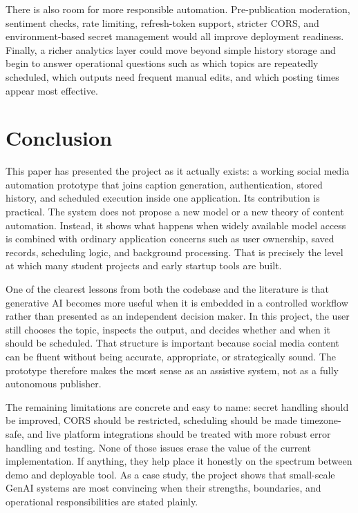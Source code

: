 \documentclass[conference]{IEEEtran}
\begin{document}
There is also room for more responsible automation. Pre-publication moderation, sentiment checks, rate limiting, refresh-token support, stricter CORS, and environment-based secret management would all improve deployment readiness. Finally, a richer analytics layer could move beyond simple history storage and begin to answer operational questions such as which topics are repeatedly scheduled, which outputs need frequent manual edits, and which posting times appear most effective.

\section{Conclusion}

This paper has presented the project as it actually exists: a working social media automation prototype that joins caption generation, authentication, stored history, and scheduled execution inside one application. Its contribution is practical. The system does not propose a new model or a new theory of content automation. Instead, it shows what happens when widely available model access is combined with ordinary application concerns such as user ownership, saved records, scheduling logic, and background processing. That is precisely the level at which many student projects and early startup tools are built.

One of the clearest lessons from both the codebase and the literature is that generative AI becomes more useful when it is embedded in a controlled workflow rather than presented as an independent decision maker. In this project, the user still chooses the topic, inspects the output, and decides whether and when it should be scheduled. That structure is important because social media content can be fluent without being accurate, appropriate, or strategically sound. The prototype therefore makes the most sense as an assistive system, not as a fully autonomous publisher.

The remaining limitations are concrete and easy to name: secret handling should be improved, CORS should be restricted, scheduling should be made timezone-safe, and live platform integrations should be treated with more robust error handling and testing. None of those issues erase the value of the current implementation. If anything, they help place it honestly on the spectrum between demo and deployable tool. As a case study, the project shows that small-scale GenAI systems are most convincing when their strengths, boundaries, and operational responsibilities are stated plainly.
\end{document}
